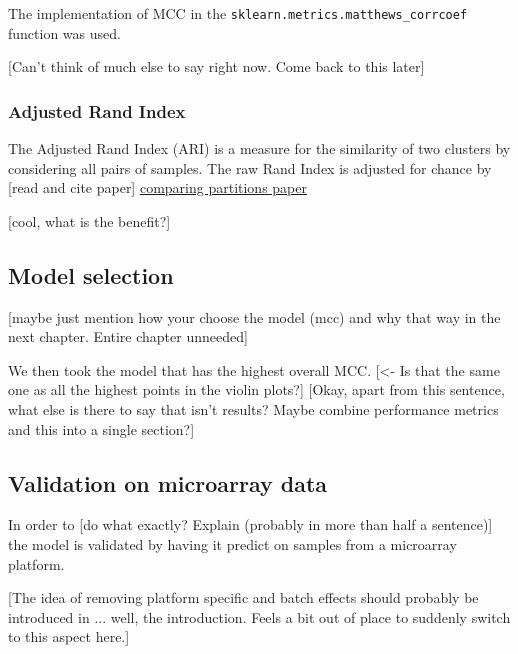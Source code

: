 The implementation of MCC in the \verb|sklearn.metrics.matthews_corrcoef| function was used.

[Can't think of much else to say right now. Come back to this later]



\subsubsection{Adjusted Rand Index}
The Adjusted Rand Index (ARI) is a measure for the similarity of two clusters by considering all pairs of samples. \cite{ari:rand}
The raw Rand Index is adjusted for chance by [read and cite paper] \cite{ari:adj}
\href{https://sci-hub.ru/10.1007/bf01908075}{comparing partitions paper}

[cool, what is the benefit?]


\subsection{Model selection}
[maybe just mention how your choose the model (mcc) and why that way in the next chapter. Entire chapter unneeded]


We then took the model that has the highest overall MCC. [<- Is that the same one as all the highest points in the violin plots?]
[Okay, apart from this sentence, what else is there to say that isn't results? Maybe combine performance metrics and this into a single section?]


\subsection{Validation on microarray data}
In order to [do what exactly? Explain (probably in more than half a sentence)] the model is validated by having it predict on samples from a microarray platform.

[The idea of removing platform specific and batch effects should probably be introduced in ... well, the introduction. Feels a bit out of place to suddenly switch to this aspect here.]


